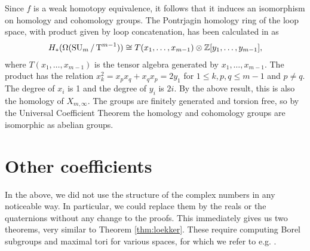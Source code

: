 Since $f$ is a weak homotopy equivalence, it follows that it induces
an isomorphism on homology and cohomology groups. The Pontrjagin
homology ring of the loop space, with product given by loop
concatenation, has been calculated in \cite[Theorem~4.1]{grbic} as
\begin{align*}
  H_*(\Omega(\operatorname{SU}_{m}/\operatorname{T}^{m-1})) \cong T(x_1,\dots,x_{m-1}) \otimes
  \mathbb{Z}[y_1,\dots,y_{m-1}],
\end{align*}
where $T(x_1,\dots,x_{m-1})$ is the tensor algebra generated by
$x_1,\dots,x_{m-1}$. The product has the relation $x_k^2 =
x_px_q+x_qx_p = 2y_1$ for $1\leq k,p,q\leq m-1$ and $p\neq q$. The
degree of $x_i$ is 1 and the degree of $y_i$
is $2i$. By the above result, this is also the homology of
$X_{m,\infty}$. The groups are finitely generated and torsion free, so
by the Universal Coefficient Theorem the homology and cohomology
groups are isomorphic as abelian groups.

\section{Other coefficients}
\label{sec:coef}

In the above, we did not use the structure of the complex numbers in
any noticeable way. In particular, we could replace them by the reals
or the quaternions without any change to the proofs. This immediately
gives us two theorems, very similar to Theorem
\ref{thm:loekker}. These require computing Borel subgroups and maximal
tori for various spaces, for which we refer to e.g. \cite[Example
6.7]{malle}.

